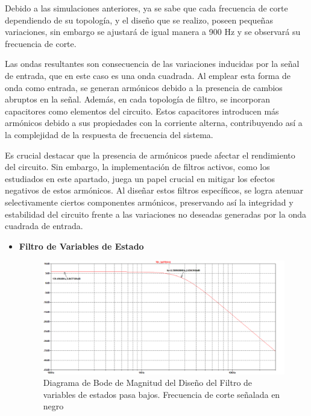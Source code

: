 \begin{enumerate}
            Debido a las simulaciones anteriores, ya se sabe que cada frecuencia de corte dependiendo de su topología, y el diseño que se realizo, poseen pequeñas variaciones, sin embargo se ajustará de igual manera a 900 Hz y se observará su frecuencia de corte.

            Las ondas resultantes son consecuencia de las variaciones inducidas por la señal de entrada, que en este caso es una onda cuadrada. Al emplear esta forma de onda como entrada, se generan armónicos debido a la presencia de cambios abruptos en la señal. Además, en cada topología de filtro, se incorporan capacitores como elementos del circuito. Estos capacitores introducen más armónicos debido a sus propiedades con la corriente alterna, contribuyendo así a la complejidad de la respuesta de frecuencia del sistema.

            Es crucial destacar que la presencia de armónicos puede afectar el rendimiento del circuito. Sin embargo, la implementación de filtros activos, como los estudiados en este apartado, juega un papel crucial en mitigar los efectos negativos de estos armónicos. Al diseñar estos filtros específicos, se logra atenuar selectivamente ciertos componentes armónicos, preservando así la integridad y estabilidad del circuito frente a las variaciones no deseadas generadas por la onda cuadrada de entrada.

            \begin{itemize}
                \item \textbf{Filtro de Variables de Estado}

                    \begin{figure}[H]
                          \centering
                          \renewcommand{\figurename}{Gráfica}
                          \includegraphics[width=15cm]{Imagenes/sim_var_estado_armonico_bode.png}
                          \caption{Diagrama de Bode de Magnitud del Diseño del Filtro de variables de estados pasa bajos. Frecuencia de corte señalada en negro}
                          \label{fig:sim_var_estado_armonico_bode}
                    \end{figure}


\end{itemize}
\end{enumerate}
